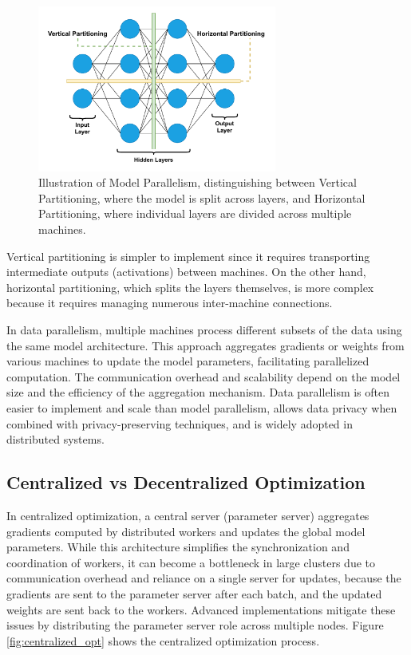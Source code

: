 \begin{figure}[!htb]
    \centering
    \includegraphics[width=0.7\textwidth]{figs/model_parallelism.pdf}
    \caption[Model Parallelism Partitioning]{Illustration of Model Parallelism, distinguishing between Vertical Partitioning, where the model is split across layers, and Horizontal Partitioning, where individual layers are divided across multiple machines.}
    \label{fig:model_parallelism}
\end{figure}

Vertical partitioning is simpler to implement since it requires transporting intermediate outputs (activations) between machines. On the other hand, horizontal partitioning, which splits the layers themselves, is more complex because it requires managing numerous inter-machine connections.

In data parallelism, multiple machines process different subsets of the data using the same model architecture. This approach aggregates gradients or weights from various machines to update the model parameters, facilitating parallelized computation. The communication overhead and scalability depend on the model size and the efficiency of the aggregation mechanism. Data parallelism is often easier to implement and scale than model parallelism, allows data privacy when combined with privacy-preserving techniques, and is widely adopted in distributed systems.

\subsection{Centralized vs Decentralized Optimization}
\label{sec:centralized-vs-decentralized-optimization}

In centralized optimization, a central server (parameter server) aggregates gradients computed by distributed workers and updates the global model parameters. While this architecture simplifies the synchronization and coordination of workers, it can become a bottleneck in large clusters due to communication overhead and reliance on a single server for updates, because the gradients are sent to the parameter server after each batch, and the updated weights are sent back to the workers. Advanced implementations mitigate these issues by distributing the parameter server role across multiple nodes. Figure \ref{fig:centralized_opt} shows the centralized optimization process.

